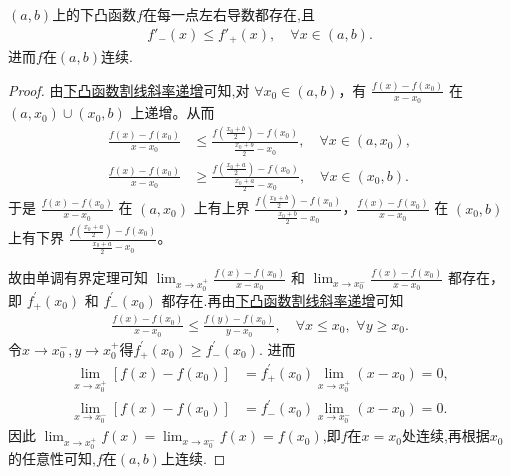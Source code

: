 \documentclass[../../main.tex]{subfiles}%
\begin{document}
\begin{theorem}[开区间下凸函数左右导数处处存在]\label{theorem:开区间下凸函数左右导数处处存在}
\((a,b)\)上的下凸函数\(f\)在每一点左右导数都存在,且
\begin{align*}
f'_-(x)\leqslant f'_+(x),\quad \forall x\in (a,b).
\end{align*}
进而\(f\)在\((a,b)\)连续.
\end{theorem}
\begin{proof}
由\hyperref[下凸函数割线斜率递增]{下凸函数割线斜率递增}可知,对 $\forall x_0\in (a,b)$，有 $\frac{f(x) - f(x_0)}{x - x_0}$ 在 $(a,x_0) \cup (x_0,b)$ 上递增。从而
\begin{align*}
\frac{f(x) - f(x_0)}{x - x_0} &\leqslant \frac{f\left(\frac{x_0 + b}{2}\right) - f(x_0)}{\frac{x_0 + b}{2} - x_0}, \quad \forall x\in (a,x_0), \\
\frac{f(x) - f(x_0)}{x - x_0} &\geqslant \frac{f\left(\frac{x_0 + a}{2}\right) - f(x_0)}{\frac{x_0 + a}{2} - x_0}, \quad \forall x\in (x_0,b).
\end{align*}
于是 $\frac{f(x) - f(x_0)}{x - x_0}$ 在 $(a,x_0)$ 上有上界 $\frac{f\left(\frac{x_0 + b}{2}\right) - f(x_0)}{\frac{x_0 + b}{2} - x_0}$，$\frac{f(x) - f(x_0)}{x - x_0}$ 在 $(x_0,b)$ 上有下界 $\frac{f\left(\frac{x_0 + a}{2}\right) - f(x_0)}{\frac{x_0 + a}{2} - x_0}$。

故由单调有界定理可知 $\lim_{x \to x_0^+} \frac{f(x) - f(x_0)}{x - x_0}$ 和 $\lim_{x \to x_0^-} \frac{f(x) - f(x_0)}{x - x_0}$ 都存在，即 $f_{+}^{\prime}(x_0)$ 和 $f_{-}^{\prime}(x_0)$ 都存在.再由\hyperref[下凸函数割线斜率递增]{下凸函数割线斜率递增}可知
\begin{align*}
\frac{f\left( x \right) -f\left( x_0 \right)}{x-x_0}\leqslant \frac{f\left( y \right) -f\left( x_0 \right)}{y-x_0},\quad \forall x\leqslant x_0,\,\,\forall y\geqslant x_0.
\end{align*}
令$x\to x_0^-,y\to x_0^+$得$f_{+}^{\prime}(x_0)\geqslant f_{-}^{\prime}(x_0)$.
进而
\begin{align*}
\lim_{x \to x_0^+} [f(x) - f(x_0)] &=f_{+}^{\prime}(x_0) \lim_{x \to x_0^+} (x - x_0) = 0, \\
\lim_{x \to x_0^-} [f(x) - f(x_0)] &=f_{-}^{\prime}(x_0) \lim_{x \to x_0^-} (x - x_0) = 0.
\end{align*}
因此 $\lim_{x \to x_0^+} f(x) = \lim_{x \to x_0^-} f(x) = f(x_0)$,即$f$在$x=x_0$处连续,再根据$x_0$的任意性可知,$f$在$(a,b)$上连续.
\end{proof}
\end{document}
